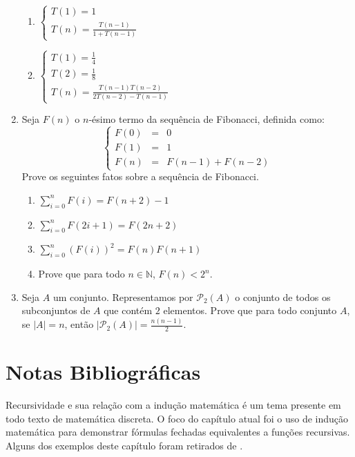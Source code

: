 \begin{enumerate}
\begin{enumerate}
		\item
				$\left\{
					\begin{array}{l}
						T(1) = 1 \\
						T(n) = \frac{T(n-1)}{1 + T(n - 1)}
					\end{array}
			    \right .$
               \item
                            $\left\{
					\begin{array}{l}
						T(1) = \frac{1}{4} \\
						T(2) = \frac{1}{8}\\
                                                T(n) =
                                                \frac{T(n-1)T(n-2)}{2T(n-2)
                                                - T(n-1)}
					\end{array}
			    \right .$
	\end{enumerate}
	\item Seja $F(n)$ o $n$-\'esimo termo da sequ\^encia de Fibonacci, definida como:
	\[
		\left\{
			\begin{array}{lcl}
				F(0) & = & 0\\
				F(1) & = & 1 \\
				F(n) & = & F(n - 1) + F(n - 2)
			\end{array}
		\right.
	\]
	Prove os seguintes fatos sobre a sequ\^encia de Fibonacci.
	\begin{enumerate}
		\item $\sum_{i=0}^{n}F(i) = F(n + 2) - 1$
		\item $\sum_{i=0}^{n}F(2i + 1) = F(2n + 2)$
		\item $\sum_{i=0}^{n}(F(i))^{2} = F(n)F(n+1)$
		\item Prove que para todo $n\in\mathbb{N}$, $F(n) < 2^n$.
	\end{enumerate}
        \item Seja $A$ um conjunto. Representamos por
          $\mathcal{P}_{2}(A)$ o conjunto de todos os subconjuntos de
          $A$ que contém $2$ elementos. Prove que para todo conjunto
          $A$, se $|A| = n$, então $|\mathcal{P}_{2}(A)| = \frac{n (n - 1)}{2}$.
\end{enumerate}

\section{Notas Bibliográficas}

Recursividade e sua relação com a indução matemática é um tema
presente em todo texto de matemática discreta. O foco do capítulo
atual foi o uso de indução matemática para demonstrar fórmulas
fechadas equivalentes a funções recursivas. Alguns dos exemplos deste
capítulo foram retirados de \cite{Graham94}.